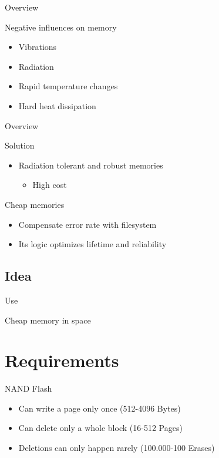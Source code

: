 \documentclass[
	,footlinenumber
	,navline=true
	,footlineauthor
	,ngerman
	]{beamer}
\begin{document}
\begin{frame}{Overview}
\begin{block}{Negative influences on memory}
\begin{itemize}
\item Vibrations
\item Radiation
\item Rapid temperature changes
\item Hard heat dissipation
\end{itemize}
\end{block}
\end{frame}

\begin{frame}{Overview}
\begin{block}{Solution}
\begin{itemize}
\item Radiation tolerant and robust memories
	\begin{itemize}
	\item<alert@1-> High cost
	\end{itemize}
\end{itemize}
\end{block}
\begin{block}{Cheap memories}
\begin{itemize}
\item Compensate error rate with filesystem
\item Its logic optimizes lifetime and reliability
\end{itemize}
\end{block}

\end{frame}

\subsection{Idea}

\begin{frame}{Use}
\begin{center}
Cheap memory in space
\end{center}
\end{frame}

\section{Requirements}
\begin{frame}{NAND Flash}
	\begin{block}{}
		\begin{itemize}
			\item Can write a page only once (512-4096 Bytes)
			\item Can delete only a whole block (16-512 Pages)
			\item Deletions can only happen rarely (100.000-100 Erases)
		\end{itemize}
	\end{block}
\end{frame}
\end{document}
